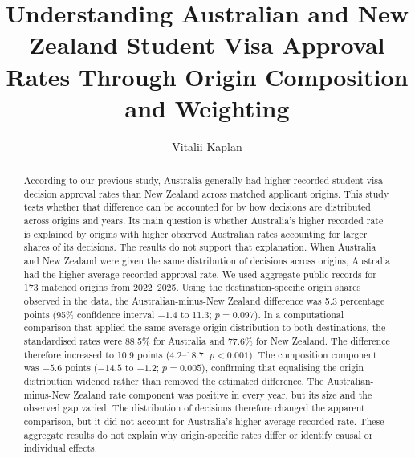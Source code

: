 \documentclass[runningheads]{llncs}
\begin{document}
\title{Understanding Australian and New Zealand Student Visa Approval Rates Through Origin Composition and Weighting}

\author{Vitalii Kaplan}

\maketitle

\begin{abstract}
According to our previous study, Australia generally had higher recorded student-visa decision approval rates than New Zealand across matched applicant origins. This study tests whether that difference can be accounted for by how decisions are distributed across origins and years. Its main question is whether Australia's higher recorded rate is explained by origins with higher observed Australian rates accounting for larger shares of its decisions. The results do not support that explanation. When Australia and New Zealand were given the same distribution of decisions across origins, Australia had the higher average recorded approval rate. We used aggregate public records for 173 matched origins from 2022--2025. Using the destination-specific origin shares observed in the data, the Australian-minus-New Zealand difference was 5.3 percentage points (95\% confidence interval $-1.4$ to 11.3; $p=0.097$). In a computational comparison that applied the same average origin distribution to both destinations, the standardised rates were 88.5\% for Australia and 77.6\% for New Zealand. The difference therefore increased to 10.9 points (4.2--18.7; $p<0.001$). The composition component was $-5.6$ points ($-14.5$ to $-1.2$; $p=0.005$), confirming that equalising the origin distribution widened rather than removed the estimated difference. The Australian-minus-New Zealand rate component was positive in every year, but its size and the observed gap varied. The distribution of decisions therefore changed the apparent comparison, but it did not account for Australia's higher average recorded rate. These aggregate results do not explain why origin-specific rates differ or identify causal or individual effects.
\end{abstract}
\end{document}
